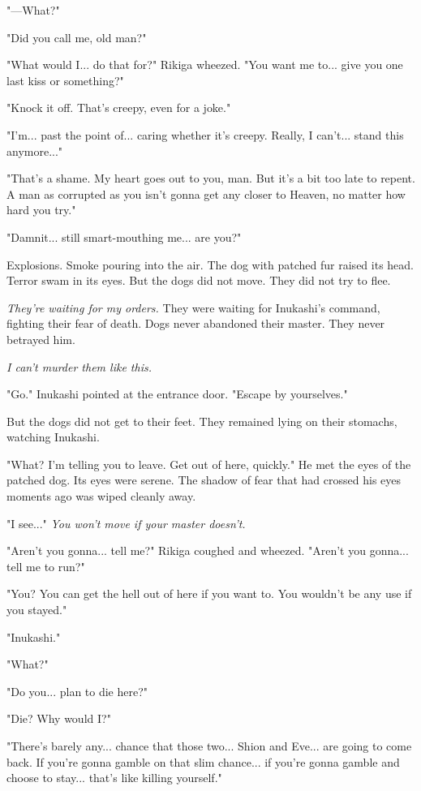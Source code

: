 "---What?"

"Did you call me, old man?"

"What would I... do that for?" Rikiga wheezed. "You want me to... give
you one last kiss or something?"

"Knock it off. That's creepy, even for a joke."

"I'm... past the point of... caring whether it's creepy. Really, I
can't... stand this anymore..."

"That's a shame. My heart goes out to you, man. But it's a bit too late
to repent. A man as corrupted as you isn't gonna get any closer to
Heaven, no matter how hard you try."

"Damnit... still smart-mouthing me... are you?"

Explosions. Smoke pouring into the air. The dog with patched fur raised
its head. Terror swam in its eyes. But the dogs did not move. They did
not try to flee.

\emph{They're waiting for my orders.} They were waiting for Inukashi's command,
fighting their fear of death. Dogs never abandoned their master. They
never betrayed him.

\emph{I can't murder them like this.}

"Go." Inukashi pointed at the entrance door. "Escape by yourselves."

But the dogs did not get to their feet. They remained lying on their
stomachs, watching Inukashi.

"What? I'm telling you to leave. Get out of here, quickly." He met the
eyes of the patched dog. Its eyes were serene. The shadow of fear that
had crossed his eyes moments ago was wiped cleanly away.

"I see..." \emph{You won't move if your master doesn't.}

"Aren't you gonna... tell me?" Rikiga coughed and wheezed. "Aren't you
gonna... tell me to run?"

"You? You can get the hell out of here if you want to. You wouldn't be
any use if you stayed."

"Inukashi."

"What?"

"Do you... plan to die here?"

"Die? Why would I?"

"There's barely any... chance that those two... Shion and Eve... are
going to come back. If you're gonna gamble on that slim chance... if
you're gonna gamble and choose to stay... that's like killing yourself."

